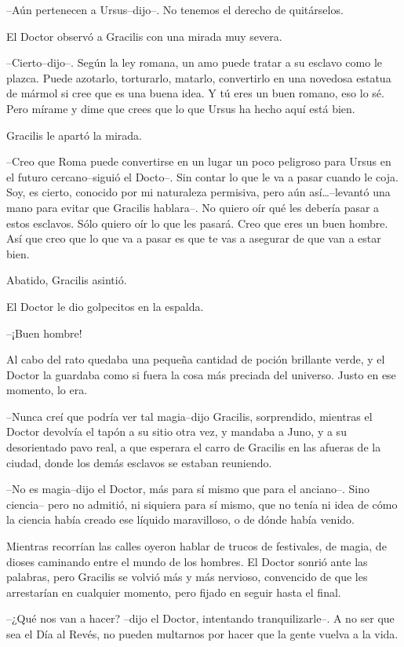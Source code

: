 --Aún pertenecen a Ursus--dijo--. No tenemos el derecho de quitárselos.

El Doctor observó a Gracilis con una mirada muy severa.

--Cierto--dijo--. Según la ley romana, un amo puede tratar a su esclavo
como le plazca. Puede azotarlo, torturarlo, matarlo, convertirlo en una
novedosa estatua de mármol si cree que es una buena idea. Y tú eres un
buen romano, eso lo sé. Pero mírame y dime que crees que lo que Ursus ha
hecho aquí está bien.

Gracilis le apartó la mirada.

--Creo que Roma puede convertirse en un lugar un poco peligroso para
Ursus en el futuro cercano--siguió el Docto--. Sin contar lo que le va a
pasar cuando le coja. Soy, es cierto, conocido por mi naturaleza
permisiva, pero aún así\ldots{}--levantó una mano para evitar que
Gracilis hablara--. No quiero oír qué les debería pasar a estos
esclavos. Sólo quiero oír lo que les pasará. Creo que eres un buen
hombre. Así que creo que lo que va a pasar es que te vas a asegurar de
que van a estar bien.

Abatido, Gracilis asintió.

El Doctor le dio golpecitos en la espalda.

--¡Buen hombre!

Al cabo del rato quedaba una pequeña cantidad de poción brillante verde,
y el Doctor la guardaba como si fuera la cosa más preciada del universo.
Justo en ese momento, lo era.

--Nunca creí que podría ver tal magia--dijo Gracilis, sorprendido,
mientras el Doctor devolvía el tapón a su sitio otra vez, y mandaba a
Juno, y a su desorientado pavo real, a que esperara el carro de Gracilis
en las afueras de la ciudad, donde los demás esclavos se estaban
reuniendo.

--No es magia--dijo el Doctor, más para sí mismo que para el anciano--.
Sino ciencia-- pero no admitió, ni siquiera para sí mismo, que no tenía
ni idea de cómo la ciencia había creado ese líquido maravilloso, o de
dónde había venido.

Mientras recorrían las calles oyeron hablar de trucos de festivales, de
magia, de dioses caminando entre el mundo de los hombres. El Doctor
sonrió ante las palabras, pero Gracilis se volvió más y más nervioso,
convencido de que les arrestarían en cualquier momento, pero fijado en
seguir hasta el final.

--¿Qué nos van a hacer? --dijo el Doctor, intentando tranquilizarle--. A
no ser que sea el Día al Revés, no pueden multarnos por hacer que la
gente vuelva a la vida.

